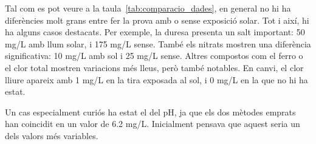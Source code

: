 Tal com es pot veure a la taula~\ref{tab:comparacio_dades}, en general no hi ha diferències molt grans entre fer la prova amb o sense exposició solar. Tot i així, hi ha alguns casos destacats. Per exemple, la duresa presenta un salt important: 50 mg/L amb llum solar, i 175 mg/L sense. També els nitrats mostren una diferència significativa: 10 mg/L amb sol i 25 mg/L sense. Altres compostos com el ferro o el clor total mostren variacions més lleus, però també notables. En canvi, el clor lliure apareix amb 1 mg/L en la tira exposada al sol, i 0 mg/L en la que no hi ha estat.

\begin{table}[H]
\centering
{}
\caption{Resultats del primer experiment}
\label{tab:comparacio_dades}
\end{table}

\clearpage
Un cas especialment curiós ha estat el del pH, ja que els dos mètodes emprats han coincidit en un valor de 6.2 mg/L. Inicialment pensava que aquest seria un dels valors més variables.

